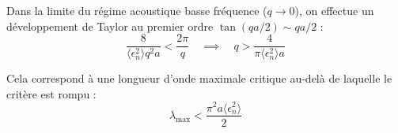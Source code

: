 Dans la limite du régime acoustique basse fréquence ($q \to 0$), on effectue un développement de Taylor au premier ordre $\tan(qa/2) \sim qa/2$ :
\begin{equation*}
    \frac{8}{\langle\epsilon_n^2\rangle q^2 a} < \frac{2\pi}{q} \quad \implies \quad q > \frac{4}{\pi \langle\epsilon_n^2\rangle a}
\end{equation*}

Cela correspond à une longueur d'onde maximale critique au-delà de laquelle le critère est rompu :
\begin{equation*}
    \lambda_{\text{max}} < \frac{\pi^2 a \langle\epsilon_n^2\rangle}{2}
\end{equation*}
